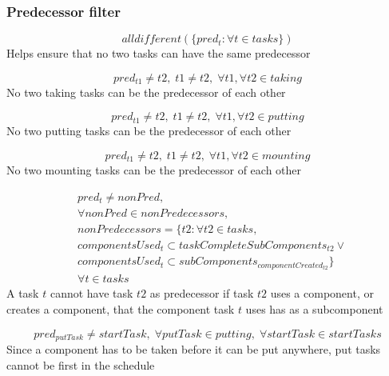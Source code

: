 \documentclass[10pt,a4paper]{report}
\begin{document}
\subsubsection*{Predecessor filter}
\begin{equation}\label{eq:74}
alldifferent(\{pred_t : \forall t \in tasks\})\end{equation}
Helps ensure that no two tasks can have the same predecessor

\begin{equation}\label{eq:75}
pred_{t1} \neq t2, \; t1 \neq t2, \; \forall t1, \forall t2 \in taking\end{equation}
No two taking tasks can be the predecessor of each other

\begin{equation}\label{eq:76}
pred_{t1} \neq t2, \; t1 \neq t2, \; \forall t1, \forall t2 \in putting\end{equation}
No two putting tasks can be the predecessor of each other

\begin{equation}\label{eq:77}
pred_{t1} \neq t2, \; t1 \neq t2, \; \forall t1, \forall t2 \in mounting\end{equation}
No two mounting tasks can be the predecessor of each other

\begin{equation}
\begin{aligned}\label{eq:78}
&pred_t \neq nonPred, \\
&\forall nonPred \in nonPredecessors, \\
&nonPredecessors = \{t2 : \forall t2 \in tasks, \\
&componentsUsed_t \subset taskCompleteSubComponents_{t2} \lor \\
&componentsUsed_t \subset subComponents_{componentCreated_{t2}}\} \\
&\forall t \in tasks
\end{aligned}
\end{equation}
A task $t$ cannot have task $t2$ as predecessor if task $t2$ uses a component, or creates a component, that the component task $t$ uses has as a subcomponent

\begin{equation}\label{eq:79}
pred_{putTask} \neq startTask, \; \forall putTask \in putting, \; \forall startTask \in startTasks\end{equation}
Since a component has to be taken before it can be put anywhere, put tasks cannot be first in the schedule
\end{document}
